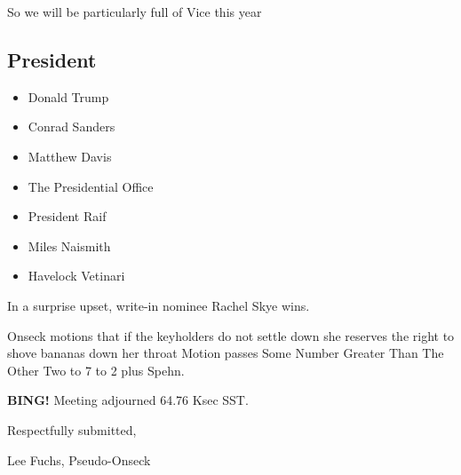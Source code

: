 \documentclass[10pt]{article}
\newcommand{\bing}{{\bf BING!} }
\newcommand{\onseck}{Lee Fuchs, Pseudo-Onseck}
\begin{document}
So we will be particularly full of Vice this year

\subsection*{President}
\begin{itemize}
\item Donald Trump
\item Conrad Sanders
\item Matthew Davis
\item The Presidential Office
\item President Raif
\item Miles Naismith
\item Havelock Vetinari
\end{itemize}

In a surprise upset, write-in nominee Rachel Skye wins.

Onseck motions that if the keyholders do not settle down she reserves the right to shove bananas down her throat
Motion passes Some Number Greater Than The Other Two to 7 to 2 plus Spehn.

\bing
\noindent
Meeting adjourned 64.76 Ksec SST.

\vspace{18pt}

\centerline{Respectfully submitted,}
\centerline{\onseck}
\end{document}
